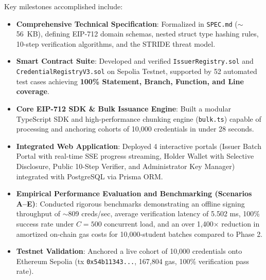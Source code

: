 \documentclass[a4paper,12pt]{report}
\begin{document}
Key milestones accomplished include:
\begin{itemize}
    \item \textbf{Comprehensive Technical Specification}: Formalized in \texttt{SPEC.md} ($\sim$56~KB), defining EIP-712 domain schemas, nested struct type hashing rules, 10-step verification algorithms, and the STRIDE threat model.
    \item \textbf{Smart Contract Suite}: Developed and verified \texttt{IssuerRegistry.sol} and \texttt{CredentialRegistryV3.sol} on Sepolia Testnet, supported by 52 automated test cases achieving \textbf{100\% Statement, Branch, Function, and Line coverage}.
    \item \textbf{Core EIP-712 SDK \& Bulk Issuance Engine}: Built a modular TypeScript SDK and high-performance chunking engine (\texttt{bulk.ts}) capable of processing and anchoring cohorts of 10,000 credentials in under 28 seconds.
    \item \textbf{Integrated Web Application}: Deployed 4 interactive portals (Issuer Batch Portal with real-time SSE progress streaming, Holder Wallet with Selective Disclosure, Public 10-Step Verifier, and Administrator Key Manager) integrated with PostgreSQL via Prisma ORM.
    \item \textbf{Empirical Performance Evaluation and Benchmarking (Scenarios A--E)}: Conducted rigorous benchmarks demonstrating an offline signing throughput of $\sim$809 creds/sec, average verification latency of 5.502 ms, 100\% success rate under $C=500$ concurrent load, and an over 1,400$\times$ reduction in amortized on-chain gas costs for 10,000-student batches compared to Phase 2.
    \item \textbf{Testnet Validation}: Anchored a live cohort of 10,000 credentials onto Ethereum Sepolia (tx \texttt{0x54b11343...}, 167,804 gas, 100\% verification pass rate).
\end{itemize}
\fi

\afterpreface

\cleardoublepage
{}
\setcounter{page}{1}


\clearpage

\clearpage

\clearpage

\clearpage

\clearpage

\clearpage

\renewcommand{\bibname}{References}

\nocite{*}


\appendix

\end{document}
